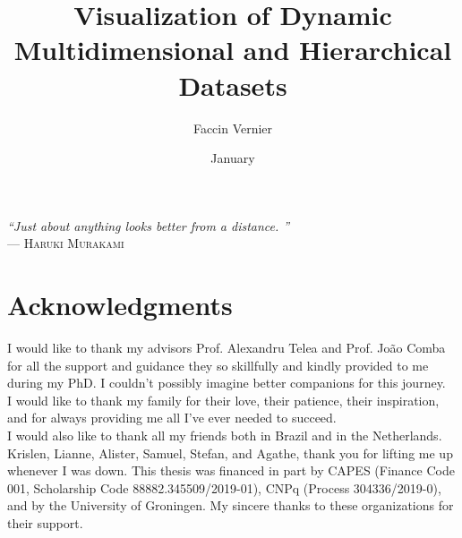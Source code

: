 \documentclass[ppgc,tese,english]{iiufrgs}
\title{Visualization of Dynamic Multidimensional and Hierarchical Datasets}
\author{Faccin Vernier}{Eduardo}
\date{January}{2022}
\begin{document}
\maketitle

\clearpage
\begin{flushright}
\mbox{}\vfill
{\sffamily\itshape
``Just about anything looks better from a distance.
''\\}
--- \textsc{Haruki Murakami}
\end{flushright}

\chapter*{Acknowledgments}
I would like to thank my advisors Prof. Alexandru Telea and Prof. Jo\~{a}o Comba for all the support and guidance they so skillfully and kindly provided to me during my PhD. I couldn't possibly imagine better companions for this journey.
\\
I would like to thank my family for their love, their patience, their inspiration, and for always providing me all I've ever needed to succeed.
\\
I would also like to thank all my friends both in Brazil and in the Netherlands. Krislen, Lianne, Alister, Samuel, Stefan, and Agathe, thank you for lifting me up whenever I was down.
\bigbreak
This thesis was financed in part by CAPES (Finance Code 001, Scholarship Code 88882.345509/2019-01), CNPq (Process 304336/2019-0), and by the University of Groningen. 
My sincere thanks to these organizations for their support.
\end{document}
